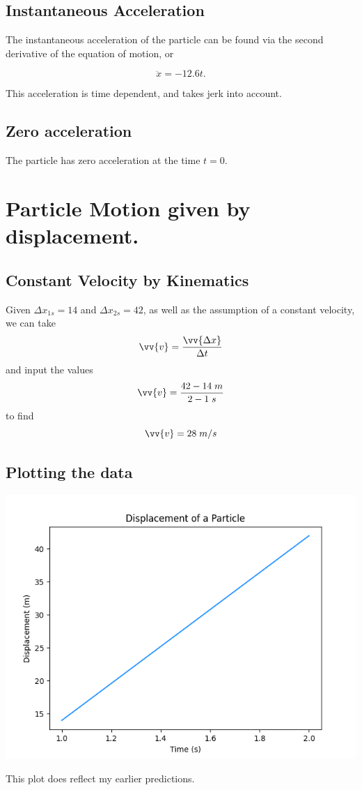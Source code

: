 \documentclass[11pt, letterpaper]{article}
\begin{document}
\subsection{Instantaneous Acceleration}

The instantaneous acceleration of the particle can be found via the second 
derivative of the equation of motion, or

\begin{equation}
	\ddot{x} = -12.6t.
\end{equation}

This acceleration is time dependent, and takes jerk into account. 

\subsection{Zero acceleration}

The particle has zero acceleration at the time $t=0$.


\section{Particle Motion given by displacement.}

\subsection{Constant Velocity by Kinematics}
Given $\Delta x_{1 s} = 14$ and $\Delta x_{2s} = 42$, as well as the assumption of a 
constant velocity, we can take 
\begin{equation}
	\vv{v} = \frac{\vv{\Delta x}}{\Delta t}
\end{equation}
and input the values 
\begin{equation}
	\vv{v} = \frac{42-14 \;m}{2-1 \;s}
\end{equation}
to find 
\begin{equation}
	\vv{v} = 28 \;m/s
\end{equation}

\subsection{Plotting the data}
\includegraphics{plot_2a.png}

This plot does reflect my earlier predictions.
\end{document}
